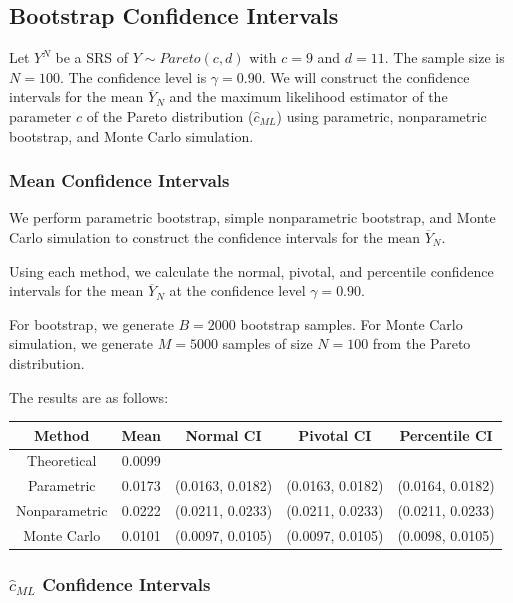\documentclass{article}
\begin{document}
\subsection{Bootstrap Confidence Intervals}

Let \(Y^N\) be a SRS of \(Y \sim Pareto(c, d)\) with \(c = 9\) and \(d = 11\). The sample size is \(N = 100\). The confidence level is \(\gamma = 0.90\). We will construct the confidence intervals for the mean \(\overline{Y}_N\) and the maximum likelihood estimator of the parameter \(c\) of the Pareto distribution (\(\hat{c}_{ML}\)) using parametric, nonparametric bootstrap, and Monte Carlo simulation.

\subsubsection{Mean Confidence Intervals}

We perform parametric bootstrap, simple nonparametric bootstrap, and Monte Carlo simulation to construct the confidence intervals for the mean \(\overline{Y}_N\).

Using each method, we calculate the normal, pivotal, and percentile confidence intervals for the mean \(\overline{Y}_N\) at the confidence level \(\gamma = 0.90\).

For bootstrap, we generate \(B = 2000\) bootstrap samples. For Monte Carlo simulation, we generate \(M = 5000\) samples of size \(N = 100\) from the Pareto distribution.

The results are as follows:

\begin{table}[h]
\centering
\begin{tabular}{|c|c|c|c|c|}
\hline
\textbf{Method} & \textbf{Mean} & \textbf{Normal CI} & \textbf{Pivotal CI} & \textbf{Percentile CI} \\ \hline
Theoretical & 0.0099 & & & \\ \hline
Parametric & 0.0173 & (0.0163, 0.0182) & (0.0163, 0.0182) & (0.0164, 0.0182) \\ \hline
Nonparametric & 0.0222 & (0.0211, 0.0233) & (0.0211, 0.0233) & (0.0211, 0.0233) \\ \hline
Monte Carlo & 0.0101 & (0.0097, 0.0105) & (0.0097, 0.0105) & (0.0098, 0.0105) \\ \hline
\end{tabular}
\end{table}

\subsubsection{\(\hat{c}_{ML}\) Confidence Intervals}
\end{document}
